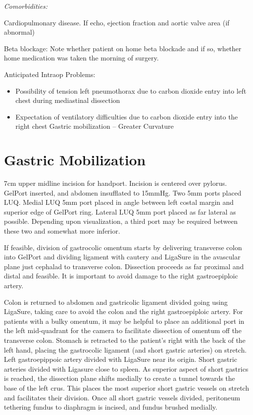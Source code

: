 \documentclass[
]{book}
\providecommand{\tightlist}{%
  \setlength{\itemsep}{0pt}\setlength{\parskip}{0pt}}
\begin{document}
\emph{Comorbidities:}

Cardiopulmonary disease. If echo, ejection fraction and aortic valve area (if abnormal)

Beta blockage: Note whether patient on home beta blockade and if so, whether home medication was taken the morning of surgery.

Anticipated Intraop Problems:

\begin{itemize}
\tightlist
\item
  Possibility of tension left pneumothorax due to carbon dioxide entry into left chest during mediastinal dissection
\item
  Expectation of ventilatory difficulties due to carbon dioxide entry into the right chest Gastric mobilization -- Greater Curvature
\end{itemize}

\hypertarget{gastric-mobilization}{%
\section{Gastric Mobilization}\label{gastric-mobilization}}

7cm upper midline incision for handport. Incision is centered over pylorus. GelPort inserted, and abdomen insufflated to 15mmHg. Two 5mm ports placed LUQ. Medial LUQ 5mm port placed in angle between left costal margin and superior edge of GelPort ring. Lateral LUQ 5mm port placed as far lateral as possible. Depending upon visualization, a third port may be required between these two and somewhat more inferior.

If feasible, division of gastrocolic omentum starts by delivering transverse colon into GelPort and dividing ligament with cautery and LigaSure in the avascular plane just cephalad to transverse colon. Dissection proceeds as far proximal and distal and feasible. It is important to avoid damage to the right gastroepiploic artery.

Colon is returned to abdomen and gastricolic ligament divided going using LigaSure, taking care to avoid the colon and the right gastroepiploic artery. For patients with a bulky omentum, it may be helpful to place an additional port in the left mid-quadrant for the camera to facilitate dissection of omentum off the transverse colon. Stomach is retracted to the patient's right with the back of the left hand, placing the gastrocolic ligament (and short gastric arteries) on stretch. Left gastroepippoic artery divided with LigaSure near its origin. Short gastric arteries divided with Ligasure close to spleen. As superior aspect of short gastrics is reached, the dissection plane shifts medially to create a tunnel towards the base of the left crus. This places the most superior short gastric vessels on stretch and facilitates their division. Once all short gastric vessels divided, peritoneum tethering fundus to diaphragm is incised, and fundus brushed medially.
\end{document}
